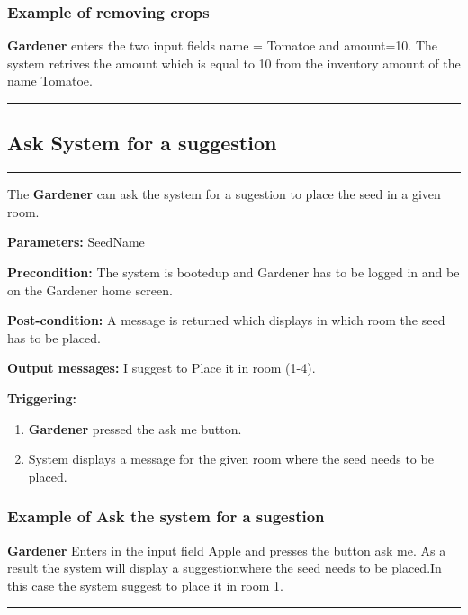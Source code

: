 \subsubsection{Example of removing crops}
\textbf{Gardener} enters the two input fields name = Tomatoe and amount=10.
The system retrives the amount which is equal to 10 from the inventory amount of
the name Tomatoe.
\hfill
\vspace{0.5cm}
\hrule


\subsection{Ask System for a suggestion}
\hrule
\hfill
\vspace{0.5cm}
\label{operation:AskSystemForASuggestion}

The \textbf{Gardener} can ask the system for a sugestion to place the seed in a
given room.
\begin{description} 

\item \textbf{Parameters:} SeedName
\item \textbf{Precondition:} The system is bootedup and Gardener has to be
logged in and be on the Gardener home screen.
\item \textbf{Post-condition:} A message is returned which displays in which
room the seed has to be placed.
\item \textbf{Output messages:} I suggest to Place it in room (1-4).
\item \textbf{Triggering:}
\begin{enumerate}
\item \textbf{Gardener} pressed the ask me button.
\item System displays a message for the given room where the seed needs to be
placed.
\end{enumerate}
\end{description}

\subsubsection{Example of Ask the system for a sugestion}
\textbf{Gardener} Enters in the input field Apple and presses the button ask me.
As a result the system will display a suggestionwhere the seed needs to be
placed.In this case the system suggest to place it in room 1.

 \hfill
\vspace{0.5cm}
\hrule



